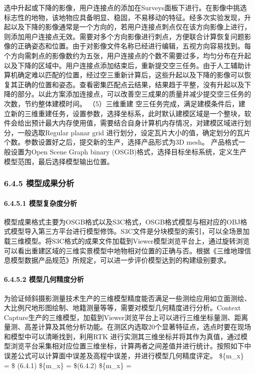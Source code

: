 选中升起或下降的影像，用户连接点的添加在Surveys面板下进行。在影像中挑选标志性的地物，该地物应具备明显、稳固，不易移动的特征。经多次实验发现，升起以及下降的影像通常是一个方向的，若用户连接点刺点仅在该方向影像上进行，则添加用户连接点无效。需要对多个方向影像进行刺点，方便联合计算恢复问题影像的正确姿态和位置。由于对影像文件名称已经进行编辑，五视方向容易找到。每个方向需刺点的影像数约为五张，用户连接点的个数不需要过多，均匀分布在升起以及下降的区域中。用户连接点添加结束后，重新提交空三任务。由于人工辅助计算机确定难以匹配的位置，经过空三重新计算后，这些升起以及下降的影像可以恢复其正确的位置和姿态。查看密集匹配点云结果，结果趋于平整，没有升起以及下降的部分。以此方案添加连接点，可以改善空三成果的质量并减少提交空三任务的次数，节约整体建模时间。 （5）三维重建 空三任务完成，满足建模条件后，建立新的三维重建任务，设置参数，选择坐标系，此时默认建模区域是一个整块，软件会给出预计最大内存使用值，需要结合自身计算机内存情况，对建模区域进行划分，一般选取Regular planar grid 进行划分，设定瓦片大小的值，确定划分的瓦片个数。参数设置好之后，提交新的生产，选择产品形式为3D mesh。 产品格式一般设置为Open Scene Graph binary (OSGB)格式，选择目标坐标系统，定义生产模型范围，最后选择模型输出位置。 \subsubsection{6.4.5 模型成果分析}\label{ux6a21ux578bux6210ux679cux5206ux6790} \paragraph{6.4.5.1 模型复杂度分析}\label{ux6a21ux578bux590dux6742ux5ea6ux5206ux6790} 模型成果格式主要为OSGB格式以及S3C格式，OSGB格式模型与相对应的OBJ格式模型导入第三方平台进行模型修饰。S3C文件是分块模型的索引，可以全场景加载三维模型。将S3C格式的成果文件加载到Viewer模型浏览平台上，通过旋转浏览可以看出重建区域的三维实景模型中地物相对位置的正确与否。根据《三维地理信息模型数据产品规范》所规定，可以进一步评价模型达到的构建级别要求。 \paragraph{6.4.5.2 模型几何精度分析}\label{ux6a21ux578bux51e0ux4f55ux7cbeux5ea6ux5206ux6790} 为验证倾斜摄影测量技术生产的三维模型精度能否满足一些测绘应用如立面测绘、大比例尺地形图绘制、地籍测量等等，需要对模型几何精度进行分析。Context Capture生产的三维模型，加载到Viewer浏览平台上可以进行三维坐标量测、距离量测、高差计算及其他分析功能。在测区内选取20个显著特征点，选点时要在现场和模型中可以清晰找到，利用RTK 进行实测其三维坐标并将其作为真值，通过模型浏览平台采集相对应位置三维坐标，计算两者之间差值并进行统计。按照如下中误差公式可以计算面中误差及高程中误差，并进行模型几何精度评定。 \$\{m\_x\} =  \$ (6.4.1) \$\{m\_x\} =  \$(6.4.2) \$\{m\_x\} = \sqrt 